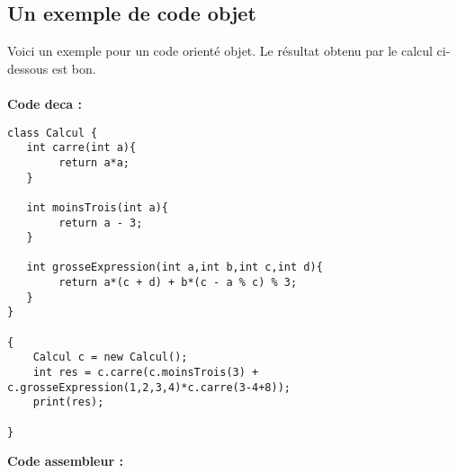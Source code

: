 \documentclass[a4,12pt]{article}
\begin{document}
\subsection{Un exemple de code objet }
Voici  un exemple pour un code orienté objet. Le résultat obtenu par le calcul ci-dessous est bon. \\ \\
\textbf{Code deca :} 
\begin{verbatim}
class Calcul {
   int carre(int a){
        return a*a;
   }

   int moinsTrois(int a){
        return a - 3;
   }

   int grosseExpression(int a,int b,int c,int d){
        return a*(c + d) + b*(c - a % c) % 3;
   }
}

{
    Calcul c = new Calcul();
    int res = c.carre(c.moinsTrois(3) + c.grosseExpression(1,2,3,4)*c.carre(3-4+8));
    print(res);

}
\end{verbatim}
\textbf{Code assembleur :} 
\end{document}

